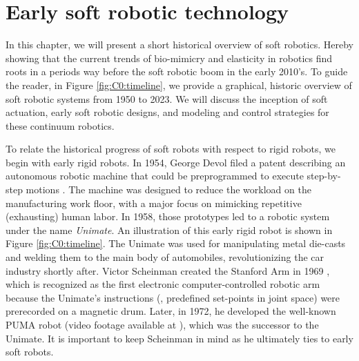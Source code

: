 \section{Early soft robotic technology}
In this chapter, we will present a short historical overview of soft robotics. Hereby showing that the current trends of bio-mimicry and elasticity in robotics find roots in a periods way before the soft robotic boom in the early 2010's. To guide the reader, in Figure \ref{fig:C0:timeline}, we provide a graphical, historic overview of soft robotic systems from 1950 to 2023. We will discuss the inception of soft actuation, early soft robotic designs, and modeling and control strategies for these continuum robotics.

To relate the historical progress of soft robots with respect to rigid robots, we begin with early rigid robots. In 1954, George Devol filed a patent describing an autonomous robotic machine that could be preprogrammed to execute step-by-step motions \cite{Mickle2008}. The machine was designed to reduce the workload on the manufacturing work floor, with a major focus on mimicking repetitive (exhausting) human labor. In 1958, those prototypes led to a robotic system under the name \emph{Unimate}. An illustration of this early rigid robot is shown in Figure \ref{fig:C0:timeline}. The Unimate was used for manipulating metal die-casts and welding them to the main body of automobiles, revolutionizing the car industry shortly after. Victor Scheinman created the Stanford Arm in 1969 \cite{BibEntryStanford2022Sep,BibEntryOrm2019Sep}, which is recognized as the first electronic computer-controlled robotic arm because the Unimate's instructions (\ie, predefined set-points in joint space) were prerecorded on a magnetic drum. Later, in 1972, he developed the well-known PUMA robot (video footage available at \cite{BibEntryPuma2022Sep}), which was the successor to the Unimate. It is important to keep Scheinman in mind as he ultimately ties to early soft robots. \vspace{0.085em}

